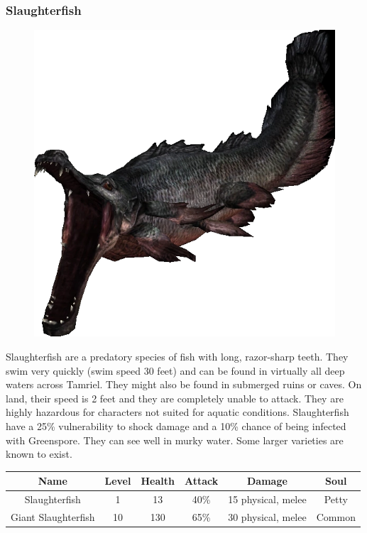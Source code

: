 \documentclass[12pt]{book}
\begin{document}
\subsubsection{Slaughterfish}

\begin{figure}[h]
	\centering
	\includegraphics[scale=0.3]{slaughterfish.png}
\end{figure}

Slaughterfish are a predatory species of fish with long, razor-sharp teeth. They swim very quickly (swim speed 30 feet) and can be found in virtually all deep waters across Tamriel. They might also be found in submerged ruins or caves. On land, their speed is 2 feet and they are completely unable to attack. They are highly hazardous for characters not suited for aquatic conditions. Slaughterfish have a 25\% vulnerability to shock damage and a 10\% chance of being infected with Greenspore. They can see well in murky water. Some larger varieties are known to exist.\\

\begin{tabular}{|c|c|c|c|c|c|}
\hline
Name & Level & Health & Attack & Damage & Soul\\ \hline
Slaughterfish & 1 & 13 & 40\% & 15 physical, melee & Petty\\ \hline
Giant Slaughterfish & 10 & 130 & 65\% & 30 physical, melee & Common\\ \hline
\end{tabular}\\
\end{document}
